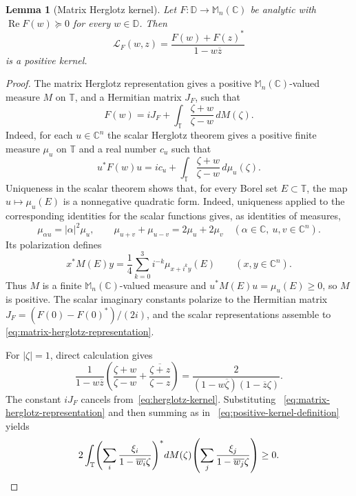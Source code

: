 \documentclass[preprints,article,submit,oneauthor]{Definitions/mdpi}
\newcounter{manuscriptresult}[section]
\theoremstyle{mdpi}
\newtheorem{lemma}[manuscriptresult]{Lemma}
\theoremstyle{definition}
\newcommand{\C}{\mathbb C}
\newcommand{\D}{\mathbb D}
\newcommand{\Torus}{\mathbb T}
\newcommand{\Mn}{\mathbb M_n(\C)}
\newcommand{\RePart}{\operatorname{Re}}
\begin{document}
\begin{lemma}[Matrix Herglotz kernel]
\label{lem:herglotz-kernel}
Let $F\colon\D\to\Mn$ be analytic with
$\RePart F(w)\succeq0$ for every $w\in\D$.  Then
\begin{equation}
  \mathcal L_F(w,z)
  =\frac{F(w)+F(z)^*}{1-w\overline z}
  \label{eq:herglotz-kernel}
\end{equation}
is a positive kernel.
\end{lemma}

\begin{proof}
The matrix Herglotz representation gives a positive
$\Mn$-valued measure $M$ on $\Torus$, and a Hermitian matrix $J_F$, such
that
\begin{equation}
  F(w)=iJ_F+\int_{\Torus}\frac{\zeta+w}{\zeta-w}\,dM(\zeta).
  \label{eq:matrix-herglotz-representation}
\end{equation}
Indeed, for each $u\in\C^n$ the scalar Herglotz theorem gives a positive
finite measure $\mu_u$ on $\Torus$ and a real number $c_u$ such that
\[
  u^*F(w)u=ic_u+
  \int_{\Torus}\frac{\zeta+w}{\zeta-w}\,d\mu_u(\zeta).
\]
Uniqueness in the scalar theorem shows that, for every Borel set
$E\subset\Torus$, the map $u\mapsto\mu_u(E)$ is a nonnegative quadratic
form.  Indeed, uniqueness applied to the corresponding identities for
the scalar functions gives, as identities of measures,
\[
  \mu_{\alpha u}=\lvert\alpha\rvert^2\mu_u,
  \qquad
  \mu_{u+v}+\mu_{u-v}=2\mu_u+2\mu_v
  \quad(\alpha\in\C,\ u,v\in\C^n).
\]
Its polarization defines
\[
  x^*M(E)y=\frac14\sum_{k=0}^3 i^{-k}
  \mu_{x+i^k y}(E)\qquad(x,y\in\C^n).
\]
Thus $M$ is a finite $\Mn$-valued measure and
$u^*M(E)u=\mu_u(E)\geq0$, so $M$ is positive.  The scalar imaginary
constants polarize to the Hermitian matrix
$J_F=(F(0)-F(0)^*)/(2i)$, and the scalar representations assemble to~%
\eqref{eq:matrix-herglotz-representation}.

For $\lvert\zeta\rvert=1$, direct calculation gives
\begin{equation}
  \frac{1}{1-w\overline z}\left(
   \frac{\zeta+w}{\zeta-w}
   +\overline{\frac{\zeta+z}{\zeta-z}}
  \right)
  =\frac{2}{(1-w\overline\zeta)(1-\overline z\zeta)}.
  \label{eq:scalar-herglotz-factorization}
\end{equation}
The constant $iJ_F$ cancels from~\eqref{eq:herglotz-kernel}.  Substituting~%
\eqref{eq:matrix-herglotz-representation} and then summing as in~%
\eqref{eq:positive-kernel-definition} yields
\[
  2\int_{\Torus}
  \left(\sum_i\frac{\xi_i}{1-\overline{w_i}\zeta}\right)^*
  dM(\zeta)
  \left(\sum_j\frac{\xi_j}{1-\overline{w_j}\zeta}\right)
  \geq0.\qedhere
\]
\end{proof}
\end{document}
